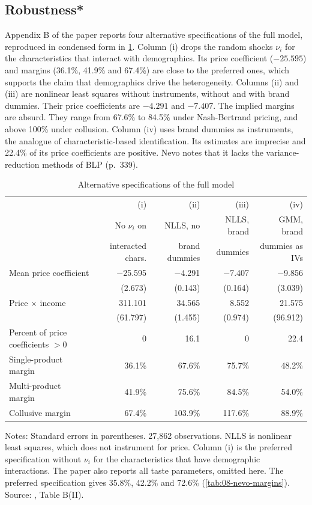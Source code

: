 \subsection{Robustness*}\label{sec:08-nevo01-robust}

Appendix B of the paper reports four alternative specifications of the full model, reproduced in condensed form
in \cref{tab:08-nevo-robust}. Column (i) drops the random shocks $\nu_i$ for the characteristics that interact
with demographics. Its price coefficient ($-25.595$) and margins (36.1\%, 41.9\% and 67.4\%) are close to the
preferred ones, which supports the claim that demographics drive the heterogeneity. Columns (ii) and (iii) are
nonlinear least squares without instruments, without and with brand dummies. Their price coefficients are
$-4.291$ and $-7.407$. The implied margins are absurd. They range from 67.6\% to 84.5\% under Nash-Bertrand
pricing, and above 100\% under collusion. Column (iv) uses brand dummies as instruments, the analogue of
characteristic-based identification. Its estimates are imprecise and 22.4\% of its price coefficients are
positive. Nevo notes that it lacks the variance-reduction methods of BLP (p.~339).

\begin{table}[htbp]
\centering
\caption{Alternative specifications of the full model}
\label{tab:08-nevo-robust}
\footnotesize
\begin{tabular}{@{}lrrrr@{}}
\toprule
 & (i) & (ii) & (iii) & (iv) \\
 & No $\nu_i$ on & NLLS, no & NLLS, brand & GMM, brand \\
 & interacted chars. & brand dummies & dummies & dummies as IVs \\
\midrule
Mean price coefficient & $-$25.595 & $-$4.291 & $-$7.407 & $-$9.856 \\
 & (2.673) & (0.143) & (0.164) & (3.039) \\
Price $\times$ income & 311.101 & 34.565 & 8.552 & 21.575 \\
 & (61.797) & (1.455) & (0.974) & (96.912) \\
Percent of price coefficients $>0$ & 0 & 16.1 & 0 & 22.4 \\
\addlinespace
Single-product margin & 36.1\% & 67.6\% & 75.7\% & 48.2\% \\
Multi-product margin & 41.9\% & 75.6\% & 84.5\% & 54.0\% \\
Collusive margin & 67.4\% & 103.9\% & 117.6\% & 88.9\% \\
\bottomrule
\end{tabular}

\smallskip
\begin{minipage}{0.88\linewidth}
\footnotesize Notes: Standard errors in parentheses. 27,862 observations. NLLS is nonlinear least squares,
which does not instrument for price. Column (i) is the preferred specification without $\nu_i$ for the
characteristics that have demographic interactions. The paper also reports all taste parameters, omitted here.
The preferred specification gives 35.8\%, 42.2\% and 72.6\% (\cref{tab:08-nevo-margins}). Source:
\citet{Nevo2001}, Table B(II).
\end{minipage}
\end{table}

